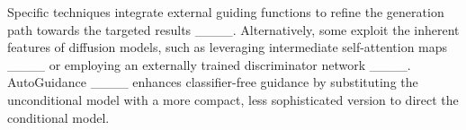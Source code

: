 Specific techniques integrate external guiding functions to refine the generation path towards the targeted results ____. Alternatively, some exploit the inherent features of diffusion models, such as leveraging intermediate self-attention maps ____ or employing an externally trained discriminator network ____. AutoGuidance ____ enhances classifier-free guidance by substituting the unconditional model with a more compact, less sophisticated version to direct the conditional model.

